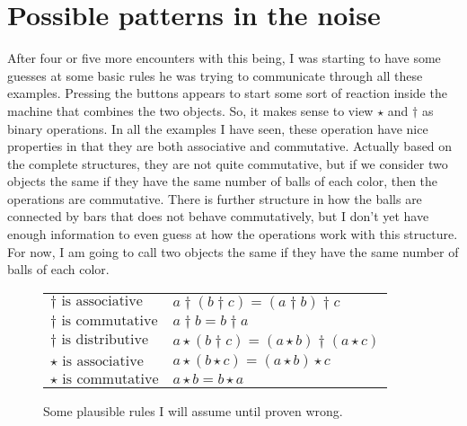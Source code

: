 \documentclass[12pt]{article}
\begin{document}
\section{Possible patterns in the noise}

After four or five more encounters with this being, I was starting to have some guesses at some basic rules he was trying to communicate through all these examples.
Pressing the buttons appears to start some sort of reaction inside the machine that combines the two objects.  So, it makes sense to view $\star$ and $\dagger$ as binary operations.
In all the examples I have seen, these operation have nice properties in that they are both associative and commutative.  Actually based on the complete structures, they are not quite commutative, but if we consider
two objects the same if they have the same number of balls of each color, then the operations are commutative.  There is further structure in how the balls are connected by bars that
does not behave commutatively, but I don't yet have enough information to even guess at how the operations work with this structure.  For now, I am going to call two objects the same if they have the same number of balls of each color.

\begin{figure}
\centering
\begin{tabular}{l|l}
$\dagger \text{ is associative}$ & $a\dagger(b\dagger c) = (a\dagger b) \dagger c$\\
$\dagger \text{ is commutative}$ & $a \dagger b = b\dagger a$\\
$\dagger \text{ is distributive}$ & $a\star (b \dagger c) = (a\star b)\dagger(a\star c)$\\
$\star \text{ is associative}$ & $a\star(b\star c) = (a\star b) \star c$\\
$\star \text{ is commutative}$ & $a \star b = b\star a$\\
\end{tabular}
\caption{Some plausible rules I will assume until proven wrong.}
\end{figure} 
\end{document}
